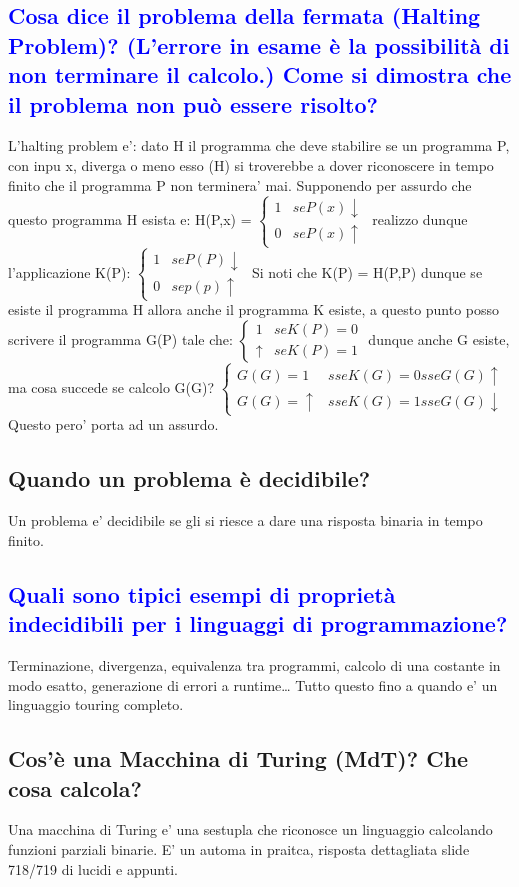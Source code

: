 \documentclass{article}
\begin{document}
\subsection{\textcolor{blue}{Cosa dice il problema della fermata (Halting Problem)? (L'errore in esame è la possibilità di non terminare il calcolo.)
        Come si dimostra che il problema non può essere risolto?}}
L'halting problem e': dato H il programma che deve stabilire se un programma P, con inpu x, diverga o meno esso (H)
si troverebbe a dover riconoscere in tempo finito che il programma P non terminera' mai. Supponendo per assurdo che questo programma H esista e:
H(P,x) =
$
\begin{cases}
    1 & se P(x) \downarrow \\
    0 & se P(x) \uparrow
\end{cases}
$
realizzo dunque l'applicazione K(P):
$
\begin{cases}
    1 & se P(P) \downarrow \\
    0 & se p(p) \uparrow
\end{cases}
$
Si noti che K(P) = H(P,P) dunque se esiste il programma H allora anche il programma K esiste, a questo punto posso scrivere il programma G(P) tale che:
$
\begin{cases}
    1        & se K(P) = 0 \\
    \uparrow & se K(P) = 1
\end{cases}
$
dunque anche G esiste, ma cosa succede se calcolo G(G)?
$
\begin{cases}
    G(G) = 1        & sse K(G) = 0  sse G(G) \uparrow   \\
    G(G) = \uparrow & sse K(G) = 1  sse G(G) \downarrow
\end{cases}
$
Questo pero' porta ad un assurdo.
\subsection{Quando un problema è decidibile?}
Un problema e' decidibile se gli si riesce a dare una risposta binaria in tempo
finito.
\subsection{\textcolor{blue}{Quali sono tipici esempi di proprietà indecidibili per i linguaggi di programmazione?}}
Terminazione, divergenza, equivalenza tra programmi, calcolo di una costante in modo esatto, generazione di errori a runtime\dots
Tutto questo fino a quando e' un linguaggio touring completo.
\subsection{Cos'è una Macchina di Turing (MdT)? Che cosa calcola?}
Una macchina di Turing e' una sestupla che riconosce un linguaggio calcolando
funzioni parziali binarie. E' un automa in praitca, risposta dettagliata slide
718/719 di lucidi e appunti.
\end{document}
